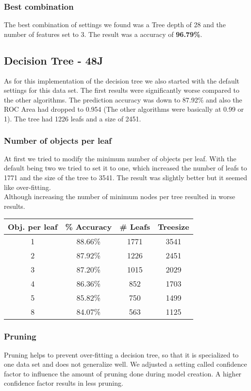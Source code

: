 \documentclass{article}
\begin{document}
\subsubsection{Best combination}
The best combination of settings we found was a Tree depth of 28 and the number of features set to 3. The result was a accuracy of \textbf{96.79\%}.
\subsection{Decision Tree - 48J}
As for this implementation of the decision tree we also started with the default settings for this data set. The first results were significantly worse compared to the other algorithms. The prediction accuracy was down to 87.92\% and also the ROC Area had dropped to 0.954 (The other algorithms were basically at 0.99 or 1). The tree had 1226 leafs and a size of 2451.
 \subsubsection{Number of objects per leaf}
 At first we tried to modify the minimum number of objects per leaf. With the default being two we tried to set it to one, which increased the number of leafs to 1771 and the size of the tree to 3541. The result was slightly better but it seemed like over-fitting. \\
 Although increasing the number of minimum nodes per tree resulted in worse results.\\
 
 \begin{center}
 \begin{tabular}{ c | c | c | c}
 \textbf{Obj. per leaf} & \textbf{\% Accuracy} & \textbf{\# Leafs} & \textbf{Treesize}\\
 \hline
 1 & 88.66\% & 1771 & 3541\\
 2 & 87.92\% & 1226 & 2451\\
 3 & 87.20\% & 1015 & 2029\\
 4 & 86.36\% & 852 & 1703\\
 5 & 85.82\% & 750 & 1499\\
 8 & 84.07\% & 563 & 1125\\
 \end{tabular}
 \end{center}
 
 \subsubsection{Pruning}
 Pruning helps to prevent over-fitting a decision tree, so that it is specialized to one data set and does not generalize well. We adjusted a setting called confidence factor to influence the amount of pruning done during model creation. A higher confidence factor results in less pruning.
 
\end{document}
